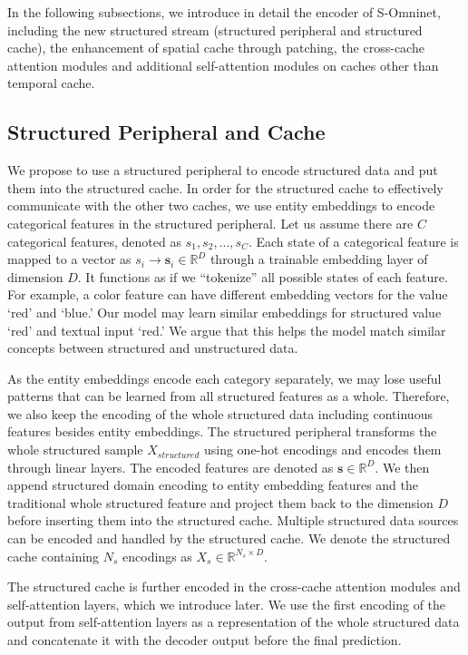 \documentclass{article}
\begin{document}
In the following subsections, we introduce in detail the encoder of S-Omninet, including the new structured stream (structured peripheral and structured cache), the enhancement of spatial cache through patching, the cross-cache attention modules and additional self-attention modules on caches other than temporal cache. 

\subsection{Structured Peripheral and Cache} \label{encode_structured}

We propose to use a structured peripheral to encode structured data and put them into the structured cache. In order for the structured cache to effectively communicate with the other two caches, we use entity embeddings to encode categorical features in the structured peripheral. Let us assume there are $C$ categorical features, denoted as $s_1, s_2, ..., s_C$. Each state of a categorical feature is mapped to a vector as $s_i \rightarrow \mathbf{s}_i \in \mathbb{R}^{D}$ through a trainable embedding layer of dimension $D$. It functions as if we ``tokenize'' all possible states of each feature. For example, a color feature can have different embedding vectors for the value `red' and `blue.' Our model may learn similar embeddings for structured value `red' and textual input `red.' We argue that this helps the model match similar concepts between structured and unstructured data.

As the entity embeddings encode each category separately, we may lose useful patterns that can be learned from all structured features as a whole. Therefore, we also keep the encoding of the whole structured data including continuous features besides entity embeddings. The structured peripheral transforms the whole structured sample $X_{structured}$ using one-hot encodings and encodes them through linear layers. The encoded features are denoted as $\mathbf{s} \in \mathbb{R}^{D}$. We then append structured domain encoding to entity embedding features and the traditional whole structured feature and project them back to the dimension $D$ before inserting them into the structured cache. Multiple structured data sources can be encoded and handled by the structured cache. We denote the structured cache containing $N_s$ encodings as  $X_{s} \in \mathbb{R}^{N_s \times D}$.

The structured cache is further encoded in the cross-cache attention modules and self-attention layers, which we introduce later. We use the first encoding of the output from self-attention layers as a representation of the whole structured data and concatenate it with the decoder output before the final prediction.
\end{document}
